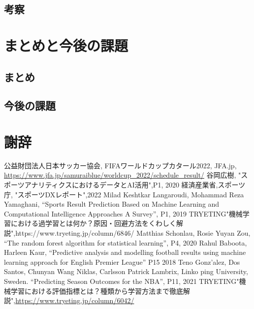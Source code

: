 \documentclass[platex]{suribt}
\begin{document}
\section{考察}

\chapter{まとめと今後の課題}
\section{まとめ}
\section{今後の課題}

\backmatter%
\chapter{謝辞}%

\begin{thebibliography}{2}%
\bibitem{}
公益財団法人日本サッカー協会, FIFAワールドカップカタール2022, JFA.jp, \url{https://www.jfa.jp/samuraiblue/worldcup_2022/schedule_result/}
\bibitem{}
谷岡広樹, "スポーツアナリティクスにおけるデータとAI活用",P1, 2020
\bibitem{}
経済産業省,スポーツ庁, "スポーツDXレポート",2022
\bibitem{}
Milad Keshtkar Langaroudi, Mohammad Reza Yamaghani, “Sports Result Prediction Based on Machine Learning and Computational Intelligence Approaches A Survey”, P1, 2019
\bibitem{}
TRYETING"機械学習における過学習とは何か？原因・回避方法をくわしく解説",https://www.tryeting.jp/column/6846/
\bibitem{}
Matthias Schonlau, Rosie Yuyan Zou, “The random forest algorithm for statistical learning”, P4, 2020
\bibitem{}
Rahul Baboota, Harleen Kaur, “Predictive analysis and modelling football results using machine learning approach for English Premier League” P15 2018
\bibitem{}
Teno Gonz'alez, Dos Santos, Chunyan Wang Niklas, Carlsson Patrick Lambrix, Linko ping University, Sweden. “Predicting Season Outcomes for the NBA”, P11, 2021
\bibitem{}
TRYETING"機械学習における評価指標とは？種類から学習方法まで徹底解説",\url{https://www.tryeting.jp/column/6042/}



\end{thebibliography}
\appendix%
\chapter{}
\end{document}
